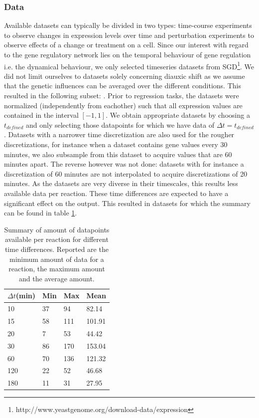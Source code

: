 \subsubsection{Data}
Available datasets can typically be divided in two types: time-course experiments to observe changes in expression levels over time and perturbation experiments to observe effects of a change or treatment on a cell. Since our interest with 
regard to the gene regulatory network lies on the temporal behaviour of gene regulation i.e. the dynamical behaviour, we only selected timeseries datasets from SGD\footnote{http://www.yeastgenome.org/download-data/expression}. We did not 
limit ourselves to datasets solely concerning diauxic shift as we assume that the genetic influences can be averaged over the different conditions. 
This resulted in the following subset: \cite{brauer2005homeostatic,spellman1998comprehensive,cho1998genome,derisi1997exploring,lee2000arrest,carmel2001role}.
Prior to regression tasks, the datasets were normalized (independently from eachother) such that all expression values are contained in the interval $[-1,1]$.%
We obtain appropriate datasets by choosing a $t_{defined}$ and only selecting those datapoints for which we have data of $\Delta t = t_{defined}$.
Datasets with a narrower time discretization are also used for the rougher discretizations, for instance when a dataset contains gene values every 30 minutes, we also subsample from this dataset to acquire values that are 60 minutes apart.
The reverse however was not done: datasets with for instance a discretization of 60 minutes are not interpolated to acquire discretizations of 20 minutes.
As the datasets are very diverse in their timescales, this results less available data per reaction. These time 
differences are expected to have a significant effect on the output. This resulted in datasets for which the summary can be found in table \ref{tab:summary_time_datasets}.
\begin{table}[htb]
	\centering
    \begin{tabular}{llll}
    \hline
$\Delta t$(min)&Min&Max&Mean\\
\hline
10&37&94&82.14\\
15&58&111&101.91\\
20&7&53&44.42\\
30&86&170&153.04\\
60&70&136&121.32\\
120&22&52&46.68\\
180&11&31&27.95\\
    \hline
    \end{tabular}
    \caption{ Summary of amount of datapoints available per reaction for different time differences. Reported are the minimum amount of data for a reaction, the maximum amount and the average amount. }
	\label{tab:summary_time_datasets}

\end{table}

